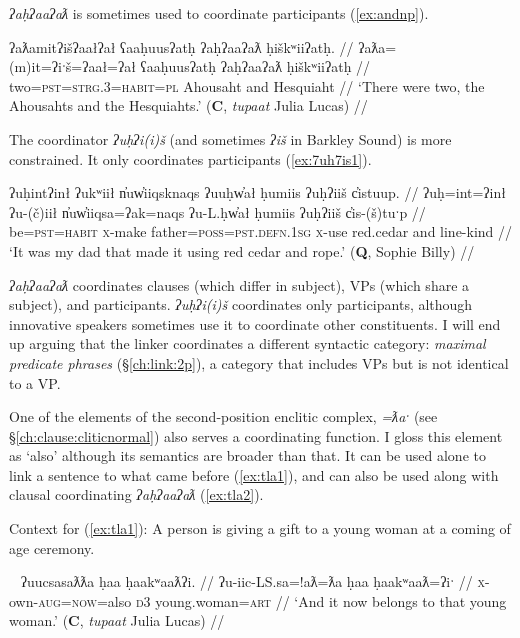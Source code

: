 \textit{ʔaḥʔaaʔaƛ} is sometimes used to coordinate participants (\ref{ex:andnp}).

\ex \label{ex:andnp}
\begingl
\glpreamble ʔaƛamitʔišʔaałʔał ʕaaḥuusʔatḥ ʔaḥʔaaʔaƛ ḥiškʷiiʔatḥ. //
\gla ʔaƛa=(m)it=ʔiˑš=ʔaał=ʔał ʕaaḥuusʔatḥ ʔaḥʔaaʔaƛ ḥiškʷiiʔatḥ //
\glb two=\textsc{pst}=\textsc{strg.3}=\textsc{habit}=\textsc{pl} Ahousaht and Hesquiaht //
\glft `There were two, the Ahousahts and the Hesquiahts.' (\textbf{C}, \textit{tupaat} Julia Lucas) //
\endgl
\xe

The coordinator \textit{ʔuḥʔi(i)š} (and sometimes \textit{ʔiš} in Barkley Sound) is more constrained. It only coordinates participants (\ref{ex:7uh7is1}).

\ex \label{ex:7uh7is1}
\begingl
\glpreamble ʔuḥintʔinł ʔukʷiił n̓uw̓iiqsknaqs ʔuuḥw̓ał ḥumiis ʔuḥʔiiš c̓istuup. //
\gla ʔuḥ=int=ʔinł ʔu-(č)iił n̓uw̓iiqsa=ʔak=naqs ʔu-L.ḥw̓ał ḥumiis ʔuḥʔiiš c̓is-(š)tuˑp //
\glb be=\textsc{pst}=\textsc{habit} \textsc{x}-make father=\textsc{poss}=\textsc{pst.defn.1sg} \textsc{x}-use red.cedar and line-kind //
\glft `It was my dad that made it using red cedar and rope.' (\textbf{Q}, Sophie Billy) //
\endgl
\xe

\textit{ʔaḥʔaaʔaƛ} coordinates clauses (which differ in subject), VPs (which share a subject), and participants. \textit{ʔuḥʔi(i)š} coordinates only participants, although innovative speakers sometimes use it to coordinate other constituents. I will end up arguing that the linker coordinates a different syntactic category: \textit{maximal predicate phrases} (\S\ref{ch:link:2p}), a category that includes VPs but is not identical to a VP.

One of the elements of the second-position enclitic complex, \textit{=ƛaˑ} (see \S\ref{ch:clause:cliticnormal}) also serves a coordinating function. I gloss this element as `also' although its semantics are broader than that. It can be used alone to link a sentence to what came before (\ref{ex:tla1}), and can also be used along with clausal coordinating \textit{ʔaḥʔaaʔaƛ} (\ref{ex:tla2}).

\noindent Context for (\ref{ex:tla1}): A person is giving a gift to a young woman at a coming of age ceremony.

\ex~ \label{ex:tla1}
\begingl
\glpreamble ʔuucsasaƛƛa ḥaa ḥaakʷaaƛʔi. //
\gla ʔu-iic-LS.sa=!aƛ=ƛa ḥaa ḥaakʷaaƛ=ʔiˑ //
\glb \textsc{x}-own-\textsc{aug}=\textsc{now}=also \textsc{d3} young.woman=\textsc{art} //
\glft `And it now belongs to that young woman.' (\textbf{C}, \textit{tupaat} Julia Lucas) //
\endgl
\xe

